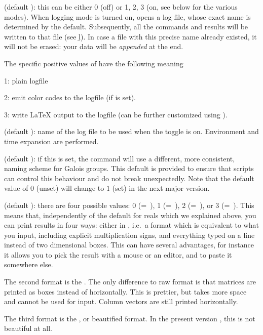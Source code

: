  (default ): this can be either 0 (off) or 1, 2, 3
(on, see below for the various modes). When logging mode is turned on,
opens a log file, whose exact name is determined by the 
default. Subsequently, all the commands and results will be written to that
file (see \b{l}). In case a file with this precise name already existed, it
will not be erased: your data will be \emph{appended} at the end.

The specific positive values of  have the following meaning

1: plain logfile

2: emit color codes to the logfile (if  is set).

3: write LaTeX output to the logfile (can be further customized using
).

 (default ): name of the log file to be
used when the  toggle is on. Environment and time expansion are
performed.

 (default ): if
this is set, the  command will use a different, more
consistent, naming scheme for Galois groups. This default is provided to
ensure that scripts can control this behaviour and do not break unexpectedly.
Note that the default value of $0$ (unset) will change to $1$ (set) in the
next major version.

 (default ): there are four possible values: 0
(=~), 1 (=~), 2 (=~), or 3
(=~). This
means that, independently of the default  for reals which we
explained above, you can print results in four ways: either in , i.e.~a format which is equivalent to what you input, including
explicit multiplication signs, and everything typed on a line instead of
two dimensional boxes. This can have several advantages, for instance it
allows you to pick the result with a mouse or an editor, and to paste it
somewhere else.\label{se:output}

The second format is the . The only difference to
raw format is that matrices are printed as boxes instead of horizontally.
This is prettier, but takes more space and cannot be used for input. Column
vectors are still printed horizontally.

The third format is the , or beautified format. In
the present version \vers, this is not beautiful at all.

